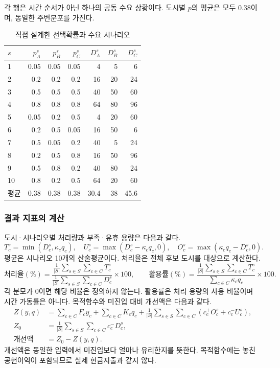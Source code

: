 \documentclass[10pt,a4paper]{article}
\begin{document}
각 행은 시간 순서가 아닌 하나의 공동 수요 상황이다.
도시별 $p$의 평균은 모두 $0.38$이며, 동일한 주변분포를 가진다.
\begin{table}[H]
\centering\small
\caption{직접 설계한 선택확률과 수요 시나리오}\label{tab:sc-scenarios}
\begin{tabular}{lrrrrrr}
\toprule
$s$ & $p_A^s$ & $p_B^s$ & $p_C^s$ & $D_A^s$ & $D_B^s$ & $D_C^s$\\\midrule
1 & 0.05 & 0.05 & 0.05 & 4 & 5 & 6\\
2 & 0.2 & 0.2 & 0.2 & 16 & 20 & 24\\
3 & 0.5 & 0.5 & 0.5 & 40 & 50 & 60\\
4 & 0.8 & 0.8 & 0.8 & 64 & 80 & 96\\
5 & 0.05 & 0.2 & 0.5 & 4 & 20 & 60\\
6 & 0.2 & 0.5 & 0.05 & 16 & 50 & 6\\
7 & 0.5 & 0.05 & 0.2 & 40 & 5 & 24\\
8 & 0.2 & 0.5 & 0.8 & 16 & 50 & 96\\
9 & 0.5 & 0.8 & 0.2 & 40 & 80 & 24\\
10 & 0.8 & 0.2 & 0.5 & 64 & 20 & 60\\
평균 & 0.38 & 0.38 & 0.38 & 30.4 & 38 & 45.6\\
\bottomrule
\end{tabular}
\end{table}

\subsubsection{결과 지표의 계산}
도시·시나리오별 처리량과 부족·유휴 용량은 다음과 같다.
\[
T_c^s=\min(D_c^s,\kappa_cq_c),\quad
U_c^s=\max(D_c^s-\kappa_cq_c,0),\quad
O_c^s=\max(\kappa_cq_c-D_c^s,0).
\]
평균은 시나리오 10개의 산술평균이다. 처리율은 전체 후보 도시를 대상으로 계산한다.
\[
\text{처리율}(\%)=
\frac{\frac{1}{|S|}\sum_{s\in S}\sum_{c\in C}T_c^s}
{\frac{1}{|S|}\sum_{s\in S}\sum_{c\in C}D_c^s}\times100,
\qquad
\text{활용률}(\%)=
\frac{\frac{1}{|S|}\sum_{s\in S}\sum_{c\in C}T_c^s}{\sum_{c\in C}\kappa_cq_c}\times100.
\]
각 분모가 0이면 해당 비율은 정의하지 않는다. 활용률은 처리 용량의 사용 비율이며 시간 가동률은 아니다.
목적함수와 미진입 대비 개선액은 다음과 같다.
\begin{align*}
Z(y,q)&=\sum_{c\in C}F_cy_c+\sum_{c\in C}K_cq_c
+\frac{1}{|S|}\sum_{s\in S}\sum_{c\in C}(c_c^+O_c^s+c_c^-U_c^s),\\
Z_0&=\frac{1}{|S|}\sum_{s\in S}\sum_{c\in C}c_c^-D_c^s,\\
\text{개선액}&=Z_0-Z(y,q).
\end{align*}
개선액은 동일한 입력에서 미진입보다 얼마나 유리한지를 뜻한다.
목적함수에는 놓친 공헌이익이 포함되므로 실제 현금지출과 같지 않다.
\end{document}
